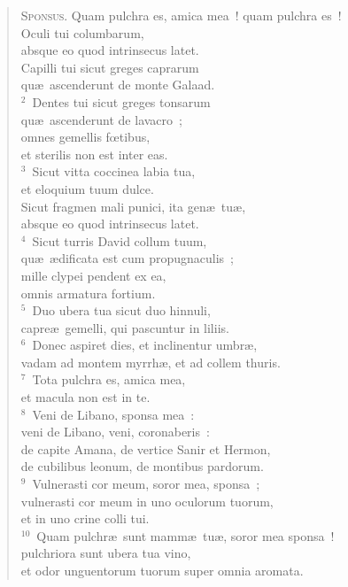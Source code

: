 \begin{flushleft}\begin{verse}\vspace{-19pt}\textsc{Sponsus.} Quam pulchra es, amica mea~! quam pulchra es~!\\ Oculi tui columbarum,\\ absque eo quod intrinsecus latet.\\ Capilli tui sicut greges caprarum\\ qu\ae\ ascenderunt de monte Galaad.\\
${}^{2}$~Dentes tui sicut greges tonsarum\\ qu\ae\ ascenderunt de lavacro~;\\ omnes gemellis fœtibus,\\ et sterilis non est inter eas.\\
${}^{3}$~Sicut vitta coccinea labia tua,\\ et eloquium tuum dulce.\\ Sicut fragmen mali punici, ita gen\ae\ tu\ae ,\\ absque eo quod intrinsecus latet.\\
${}^{4}$~Sicut turris David collum tuum,\\ qu\ae\ \ae dificata est cum propugnaculis~;\\ mille clypei pendent ex ea,\\ omnis armatura fortium.\\
${}^{5}$~Duo ubera tua sicut duo hinnuli,\\ capre\ae\ gemelli, qui pascuntur in liliis.\\
${}^{6}$~Donec aspiret dies, et inclinentur umbr\ae ,\\ vadam ad montem myrrh\ae , et ad collem thuris.\\
${}^{7}$~Tota pulchra es, amica mea,\\ et macula non est in te.\\
${}^{8}$~Veni de Libano, sponsa mea~:\\ veni de Libano, veni, coronaberis~:\\ de capite Amana, de vertice Sanir et Hermon,\\ de cubilibus leonum, de montibus pardorum.\\
${}^{9}$~Vulnerasti cor meum, soror mea, sponsa~;\\ vulnerasti cor meum in uno oculorum tuorum,\\ et in uno crine colli tui.\\
${}^{10}$~Quam pulchr\ae\ sunt mamm\ae\ tu\ae , soror mea sponsa~!\\ pulchriora sunt ubera tua vino,\\ et odor unguentorum tuorum super omnia aromata.\\

\end{verse}
\end{flushleft}
